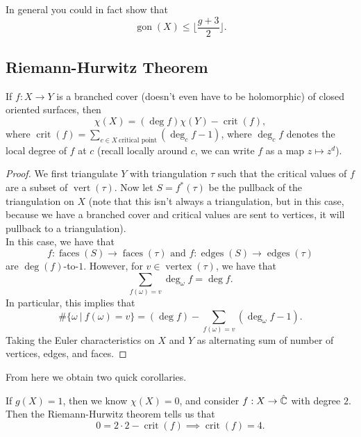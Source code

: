 \documentclass{article}
\begin{document}
{\begin{remark}
    In general you could in fact show that
    \[\operatorname{gon}(X) \leq \lfloor \frac{g+3}{2} \rfloor.\]
\end{remark}

\subsection{Riemann-Hurwitz Theorem}

\begin{theorem}
    If $f: X \to Y$ is a branched cover (doesn't even have to be holomorphic) of closed oriented surfaces, then 
    \[\chi(X) = (\deg f) \chi(Y) - \operatorname{crit}(f),\]
    where $\operatorname{crit}(f) = \sum_{c \in X\ \text{critical point}} (\deg_c f - 1)$, where $\deg_c f$ denotes the local degree of $f$ at $c$ (recall locally around $c$, we can write $f$ as a map $z \mapsto z^d$).
\end{theorem}

\begin{proof}
    We first triangulate $Y$ with triangulation $\tau$ such that the critical values of $f$ are a subset of $\operatorname{vert}(\tau)$. Now let $S = f^*(\tau)$ be the pullback of the triangulation on $X$ (note that this isn't always a triangulation, but in this case, because we have a branched cover and critical values are sent to vertices, it will pullback to a triangulation).\\

    In this case, we have that
    \[f: \operatorname{faces}(S) \to \operatorname{faces}(\tau) \text{ and } f: \operatorname{edges}(S) \to \operatorname{edges}(\tau)\]
    are $\deg(f)$-to-$1$. However, for $v \in \operatorname{vertex}(\tau)$, we have that
    \[\sum_{f(\omega) = v} \deg_{\omega} f = \deg f.\]
    In particular, this implies that
    \[\# \{\omega\ |\ f(\omega) = v\} = (\deg f) - \sum_{f(\omega) = v} (\deg_{\omega} f - 1).\]
    Taking the Euler characteristics on $X$ and $Y$ as alternating sum of number of vertices, edges, and faces.
\end{proof}

From here we obtain two quick corollaries.
\begin{corollary}
    If $g(X) = 1$, then we know $\chi(X) = 0$, and consider $f: X \to \hat{\mathbb{C}}$ with degree $2$. Then the Riemann-Hurwitz theorem tells us that
    \[0 = 2 \cdot 2 - \operatorname{crit}(f) \implies \operatorname{crit}(f) = 4.\]
\end{corollary}

}
\end{document}
